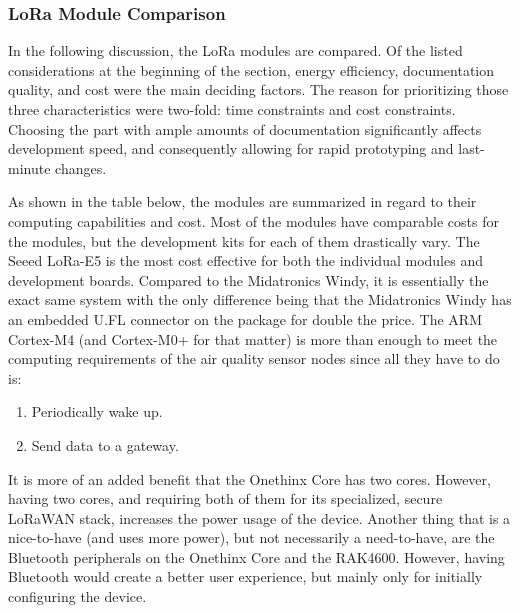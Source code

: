 \subsubsection{LoRa Module Comparison}
In the following discussion, the LoRa modules are compared. Of the listed
considerations at the beginning of the section, energy efficiency, documentation
quality, and cost were the main deciding factors. The reason for prioritizing
those three characteristics were two-fold: time constraints and cost
constraints. Choosing the part with ample amounts of documentation significantly
affects development speed, and consequently allowing for rapid prototyping and
last-minute changes.

As shown in the table below, the modules are summarized in regard to their
computing capabilities and cost. Most of the modules have comparable costs for
the modules, but the development kits for each of them drastically vary. The
Seeed LoRa-E5 is the most cost effective for both the individual modules and
development boards. Compared to the Midatronics Windy, it is essentially the
exact same system with the only difference being that the Midatronics Windy has
an embedded U.FL connector on the package for double the price. The ARM
Cortex-M4 (and Cortex-M0+ for that matter) is more than enough to meet the
computing requirements of the air quality sensor nodes since all they have to do
is:

\begin{enumerate}
    \item Periodically wake up.
    \item Send data to a gateway.
\end{enumerate}

It is more of an added
benefit that the Onethinx Core has two cores. However, having two cores, and
requiring both of them for its specialized, secure LoRaWAN stack, increases the
power usage of the device. Another thing that is a nice-to-have (and uses more
power), but not necessarily a need-to-have, are the Bluetooth peripherals on the
Onethinx Core and the RAK4600. However, having Bluetooth would create a better
user experience, but mainly only for initially configuring the device.

